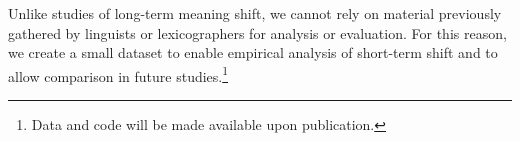 Unlike studies of long-term meaning shift, we cannot rely on material previously gathered by linguists or lexicographers for analysis or evaluation.
For this reason, we create a small dataset to enable empirical analysis of short-term
shift and to allow comparison in future studies.\footnote{Data and code will be made available upon
publication.}










